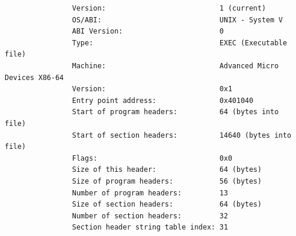 \documentclass{article}
\begin{document}
\begin{enumerate}
\begin{enumerate}
\begin{lstlisting}
				Version:                           1 (current)
				OS/ABI:                            UNIX - System V
				ABI Version:                       0
				Type:                              EXEC (Executable file)
				Machine:                           Advanced Micro Devices X86-64
				Version:                           0x1
				Entry point address:               0x401040
				Start of program headers:          64 (bytes into file)
				Start of section headers:          14640 (bytes into file)
				Flags:                             0x0
				Size of this header:               64 (bytes)
				Size of program headers:           56 (bytes)
				Number of program headers:         13
				Size of section headers:           64 (bytes)
				Number of section headers:         32
				Section header string table index: 31
			\end{lstlisting}
			
			\pagebreak
			

\end{enumerate}
\end{enumerate}
\end{document}
